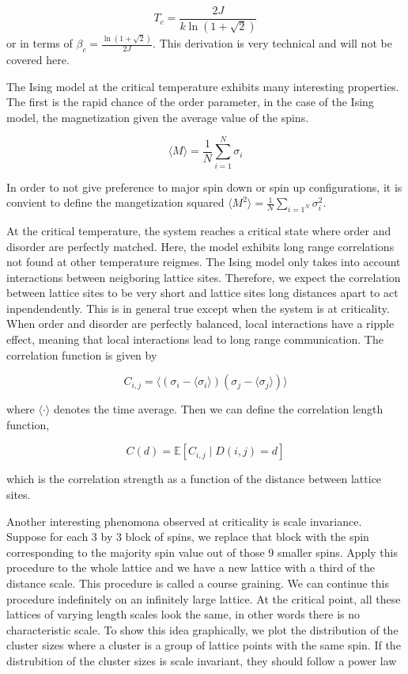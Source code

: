 \documentclass{article}
\begin{document}
\begin{equation}
    T_c = \frac{2J}{k \ln(1 + \sqrt2)}
\end{equation}
or in terms of $\beta_c = \frac{\ln(1 + \sqrt2)}{2J}$. This derivation is very technical and will not be covered here.




The Ising model at the critical temperature exhibits many interesting properties. The first is the rapid chance of the order parameter, 
in the case of the Ising model, the magnetization given the average value of the spins.

\begin{equation}
    \langle M \rangle = \frac1N \sum_{i=1}^N \sigma_i
\end{equation}

In order to not give preference to major spin down or spin up configurations, it is convient to define the mangetization squared
$\langle M^2 \rangle = \frac1N \sum_{i=1^N} \sigma_i^2$.

At the critical temperature, the system reaches a critical state where order and disorder are perfectly matched.
Here, the model exhibits long range correlations not found at other temperature reigmes. The Ising model only takes into account
interactions between neigboring lattice sites. Therefore, we expect the correlation between lattice sites to be very short and lattice sites
long distances apart to act inpendendently. This is in general true except when the system is at criticality. When order and disorder
are perfectly balanced, local interactions have a ripple effect, meaning that local interactions lead to long range communication. The correlation function is given by

\begin{equation}
    C_{i,j} = \langle (\sigma_i - \langle \sigma_i \rangle)(\sigma_j - \langle \sigma_j \rangle) \rangle
\end{equation}

where $\langle \cdot \rangle$ denotes the time average. Then we can define the correlation length function,

\begin{equation}
    C(d) = \mathbb{E} \left[ C_{i,j} \mid D(i,j) = d \right]
\end{equation}

which is the correlation strength as a function of the distance between lattice sites.

Another interesting phenomona observed at criticality is scale invariance. Suppose for each 3 by 3 block of spins, we replace that block
with the spin corresponding to the majority spin value out of those 9 smaller spins. Apply this procedure to the whole lattice and we have
a new lattice with a third of the distance scale. This procedure is called a course graining. We can continue this procedure indefinitely on an 
infinitely large lattice. At the critical point, all these lattices of varying length scales look the same, in other words there is no 
characteristic scale. To show this idea graphically, we plot the distribution of the cluster sizes where a cluster is a group of lattice points with
the same spin. If the distrubition of the cluster sizes is scale invariant, they should follow a power law
\end{document}
